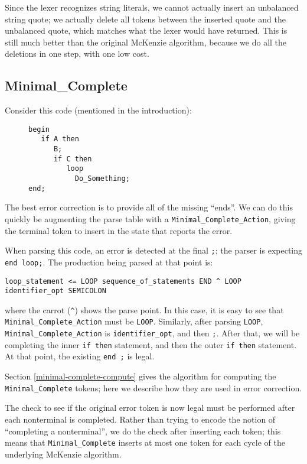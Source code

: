 \documentclass{article}
\begin{document}
Since the lexer recognizes string literals, we cannot actually insert
an unbalanced string quote; we actually delete all tokens between the
inserted quote and the unbalanced quote, which matches what the lexer
would have returned. This is still much better than the original
McKenzie algorithm, because we do all the deletions in one step, with
one low cost.

\subsection{Minimal\_Complete}
Consider this code (mentioned in the introduction):

\begin{figure}[ht]
\begin{verbatim}
begin
   if A then
      B;
      if C then
         loop
           Do_Something;
end;
\end{verbatim}
\caption{}
\label{ex:min_com_if_if_loop}
\end{figure}
The best error correction is to provide all of the missing ``ends''.
We can do this quickly be augmenting the parse table with a
\verb|Minimal_Complete_Action|, giving the terminal token to insert in
the state that reports the error.

When parsing this code, an error is detected at the final \verb|;|;
the parser is expecting \verb|end loop;|. The production being parsed
at that point is:
\begin{verbatim}
loop_statement <= LOOP sequence_of_statements END ^ LOOP identifier_opt SEMICOLON
\end{verbatim}
where the carrot (\verb|^|) shows the parse point. In this
case, it is easy to see that \verb|Minimal_Complete_Action| must be
\verb|LOOP|. Similarly, after parsing \verb|LOOP|, \verb|Minimal_Complete_Action|
is \verb|identifier_opt|, and then \verb|;|. After that,
we will be completing the inner \verb|if then| statement, and then the
outer \verb|if then| statement. At that point, the existing
\verb|end ;| is legal.

Section \ref{minimal-complete-compute} gives the algorithm for
computing the \verb|Minimal_Complete| tokens; here we describe how
they are used in error correction.

The check to see if the original error token is now legal must be
performed after each nonterminal is completed. Rather than trying to
encode the notion of ``completing a nonterminal'', we do the check
after inserting each token; this means that \verb|Minimal_Complete|
inserts at most one token for each cycle of the underlying McKenzie
algorithm.
\end{document}
